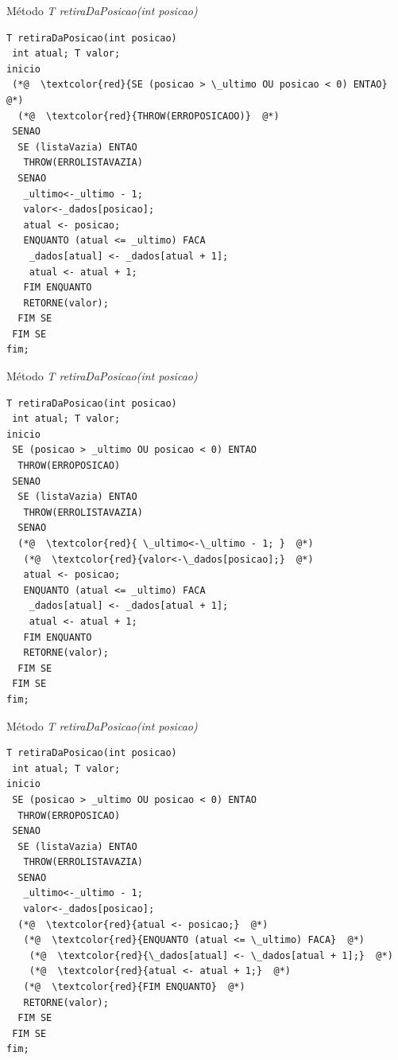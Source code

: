 \documentclass[12pt,table,xcolor={dvipsnames}]{beamer}
\begin{document}
\begin{frame}[fragile]{Método \textit{T retiraDaPosicao(int posicao)}}
\begin{lstlisting}
T retiraDaPosicao(int posicao)
 int atual; T valor;
inicio
 (*@  \textcolor{red}{SE (posicao > \_ultimo OU posicao < 0) ENTAO}  @*)
  (*@  \textcolor{red}{THROW(ERROPOSICAOO)}  @*)
 SENAO
  SE (listaVazia) ENTAO 
   THROW(ERROLISTAVAZIA)
  SENAO
   _ultimo<-_ultimo - 1; 
   valor<-_dados[posicao];
   atual <- posicao;
   ENQUANTO (atual <= _ultimo) FACA
    _dados[atual] <- _dados[atual + 1];
    atual <- atual + 1;
   FIM ENQUANTO
   RETORNE(valor);
  FIM SE
 FIM SE
fim;

\end{lstlisting}
\end{frame}

\begin{frame}[fragile]{Método \textit{T retiraDaPosicao(int posicao)}}
\begin{lstlisting}
T retiraDaPosicao(int posicao)
 int atual; T valor;
inicio
 SE (posicao > _ultimo OU posicao < 0) ENTAO
  THROW(ERROPOSICAO)
 SENAO
  SE (listaVazia) ENTAO 
   THROW(ERROLISTAVAZIA)
  SENAO
  (*@  \textcolor{red}{ \_ultimo<-\_ultimo - 1; }  @*)
   (*@  \textcolor{red}{valor<-\_dados[posicao];}  @*)
   atual <- posicao;
   ENQUANTO (atual <= _ultimo) FACA
    _dados[atual] <- _dados[atual + 1];
    atual <- atual + 1;
   FIM ENQUANTO
   RETORNE(valor);
  FIM SE
 FIM SE
fim;

\end{lstlisting}
\end{frame}

\begin{frame}[fragile]{Método \textit{T retiraDaPosicao(int posicao)}}
\begin{lstlisting}
T retiraDaPosicao(int posicao)
 int atual; T valor;
inicio
 SE (posicao > _ultimo OU posicao < 0) ENTAO
  THROW(ERROPOSICAO)
 SENAO
  SE (listaVazia) ENTAO 
   THROW(ERROLISTAVAZIA)
  SENAO
   _ultimo<-_ultimo - 1; 
   valor<-_dados[posicao];
  (*@  \textcolor{red}{atual <- posicao;}  @*)
   (*@  \textcolor{red}{ENQUANTO (atual <= \_ultimo) FACA}  @*)
    (*@  \textcolor{red}{\_dados[atual] <- \_dados[atual + 1];}  @*)
    (*@  \textcolor{red}{atual <- atual + 1;}  @*)
   (*@  \textcolor{red}{FIM ENQUANTO}  @*)
   RETORNE(valor);
  FIM SE
 FIM SE
fim;
\end{lstlisting}
\end{frame}
\end{document}
